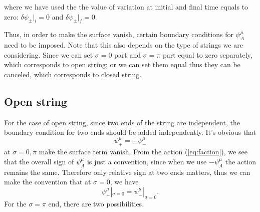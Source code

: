 \documentclass[graybox,envcountchap,sectrefs]{svmono}
\begin{document}
where we have used the the value of variation at initial and final time equals to zero: $\delta \psi_{\pm}|_i=0$ and $\delta \psi_{\pm}|_f=0$.

Thus, in order to make the surface vanish, certain boundary conditions for $\psi_{A}^{\mu}$ need to be imposed. Note that this also depends on the type of strings we are considering. Since we can set $\sigma=0$ part and $\sigma=\pi$ part equal to zero separately, which corresponds to open string; or we can set them equal thus they can be canceled, which corresponds to closed string.

\subsection{Open string}
For the case of open string, since two ends of the string are independent, the boundary condition for two ends should be added independently. It's obvious that 
\begin{equation}
\psi_{+}^{\mu}=\pm \psi_{-}^{\mu}	
\end{equation}
at $\sigma=0,\pi$ make the surface term vanish. 
From the action (\ref{eq:faction}), we see that the overall sign of $\psi^{\mu}_A$ is just a convention, since when we use $-\psi^{\mu}_A$ the action remains the same.
Therefore only relative sign at two ends matters, thus we can make the convention that at $\sigma=0$, we have
\begin{equation}
	\psi_{+}^{\mu}|_{\sigma=0}=\psi_{-}^{\mu}|_{\sigma=0}.
\end{equation}
For the $\sigma=\pi$ end, there are two possibilities.
\end{document}

